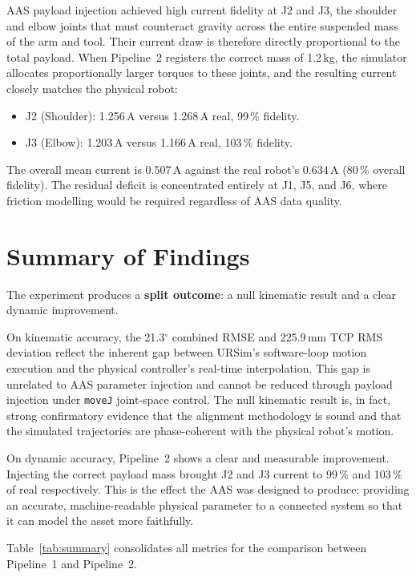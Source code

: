 AAS payload injection achieved high current fidelity at J2 and J3, the shoulder and elbow
joints that must counteract gravity across the entire suspended mass of the arm and tool.
Their current draw is therefore directly proportional to the total payload.
When Pipeline~2 registers the correct mass of 1.2\,kg, the simulator allocates proportionally
larger torques to these joints, and the resulting current closely matches the physical robot:

\begin{itemize}
    \item J2 (Shoulder): 1.256\,A versus 1.268\,A real, 99\,\% fidelity.
    \item J3 (Elbow): 1.203\,A versus 1.166\,A real, 103\,\% fidelity.
\end{itemize}

The overall mean current is 0.507\,A against the real robot's 0.634\,A (80\,\% overall
fidelity).
The residual deficit is concentrated entirely at J1, J5, and J6, where friction modelling
would be required regardless of AAS data quality.


\section{Summary of Findings}
\label{sec:eval_summary}

The experiment produces a \textbf{split outcome}: a null kinematic result and a clear dynamic
improvement.

On kinematic accuracy, the 21.3$^\circ$ combined RMSE and 225.9\,mm TCP RMS deviation reflect
the inherent gap between URSim's software-loop motion execution and the physical controller's
real-time interpolation.
This gap is unrelated to AAS parameter injection and cannot be reduced through payload injection
under \texttt{moveJ} joint-space control.
The null kinematic result is, in fact, strong confirmatory evidence that the alignment
methodology is sound and that the simulated trajectories are phase-coherent with the
physical robot's motion.

On dynamic accuracy, Pipeline~2 shows a clear and measurable improvement.
Injecting the correct payload mass brought J2 and J3 current to 99\,\% and 103\,\% of real
respectively.
This is the effect the AAS was designed to produce: providing an accurate, machine-readable
physical parameter to a connected system so that it can model the asset more faithfully.

Table~\ref{tab:summary} consolidates all metrics for the comparison between Pipeline~1 and
Pipeline~2.


